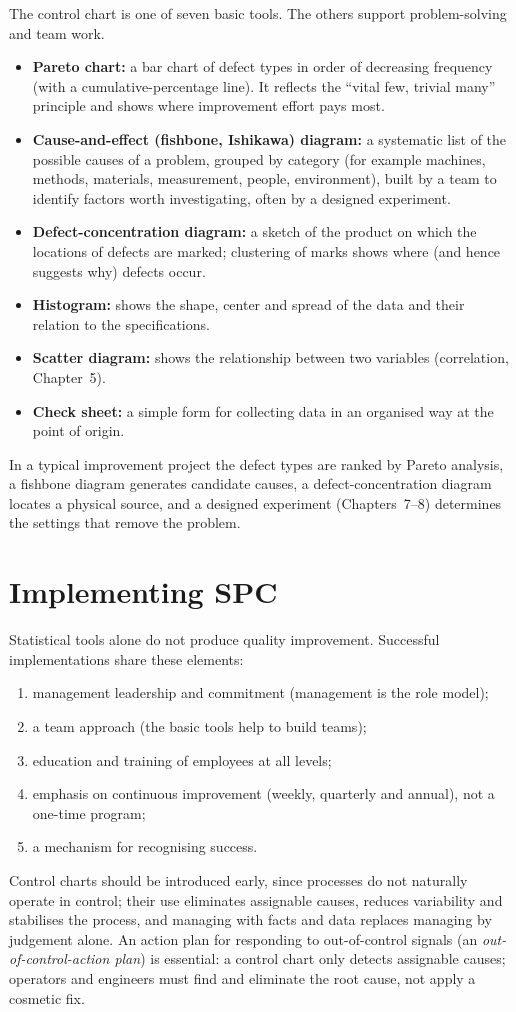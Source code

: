 The control chart is one of seven basic tools. The others support problem-solving and team work.
\begin{itemize}
  \item \textbf{Pareto chart:} a bar chart of defect types in order of decreasing frequency (with a cumulative-percentage line). It reflects the ``vital few, trivial many'' principle and shows where improvement effort pays most.
  \item \textbf{Cause-and-effect (fishbone, Ishikawa) diagram:} a systematic list of the possible causes of a problem, grouped by category (for example machines, methods, materials, measurement, people, environment), built by a team to identify factors worth investigating, often by a designed experiment.
  \item \textbf{Defect-concentration diagram:} a sketch of the product on which the locations of defects are marked; clustering of marks shows where (and hence suggests why) defects occur.
  \item \textbf{Histogram:} shows the shape, center and spread of the data and their relation to the specifications.
  \item \textbf{Scatter diagram:} shows the relationship between two variables (correlation, Chapter~5).
  \item \textbf{Check sheet:} a simple form for collecting data in an organised way at the point of origin.
\end{itemize}
In a typical improvement project the defect types are ranked by Pareto analysis, a fishbone diagram generates candidate causes, a defect-concentration diagram locates a physical source, and a designed experiment (Chapters~7--8) determines the settings that remove the problem.

\section{Implementing SPC}

Statistical tools alone do not produce quality improvement. Successful implementations share these elements:
\begin{enumerate}[label=(\arabic*)]
  \item management leadership and commitment (management is the role model);
  \item a team approach (the basic tools help to build teams);
  \item education and training of employees at all levels;
  \item emphasis on continuous improvement (weekly, quarterly and annual), not a one-time program;
  \item a mechanism for recognising success.
\end{enumerate}
Control charts should be introduced early, since processes do not naturally operate in control; their use eliminates assignable causes, reduces variability and stabilises the process, and managing with facts and data replaces managing by judgement alone. An action plan for responding to out-of-control signals (an \emph{out-of-control-action plan}) is essential: a control chart only detects assignable causes; operators and engineers must find and eliminate the root cause, not apply a cosmetic fix.


